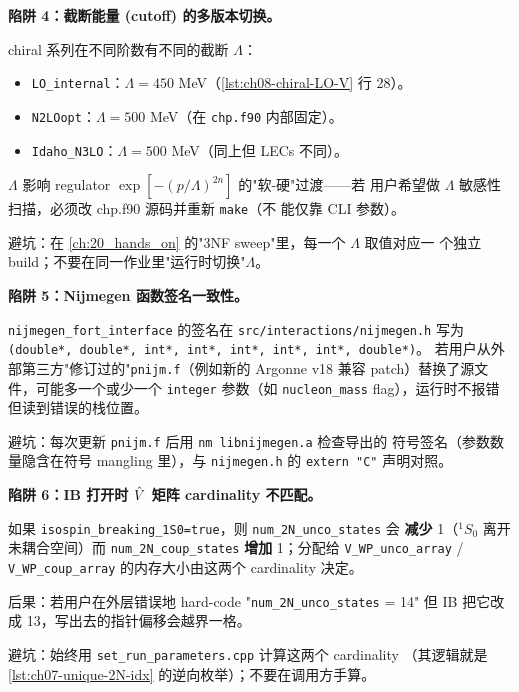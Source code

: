 \begin{pitfallbox}
\textbf{陷阱 4：截断能量 (cutoff) 的多版本切换。}

chiral 系列在不同阶数有不同的截断 \(\Lambda\)：
\begin{itemize}
  \item \texttt{LO\_internal}：\(\Lambda = 450\) MeV（\cref{lst:ch08-chiral-LO-V} 行 28）。
  \item \texttt{N2LOopt}：\(\Lambda = 500\) MeV（在 \texttt{chp.f90} 内部固定）。
  \item \texttt{Idaho\_N3LO}：\(\Lambda = 500\) MeV（同上但 LECs 不同）。
\end{itemize}

\(\Lambda\) 影响 regulator \(\exp[-(p/\Lambda)^{2n}]\) 的"软-硬"过渡——若
用户希望做 \(\Lambda\) 敏感性扫描，必须改 chp.f90 源码并重新 \texttt{make}（不
能仅靠 CLI 参数）。

避坑：在 \cref{ch:20_hands_on} 的"3NF sweep"里，每一个 \(\Lambda\) 取值对应一
个独立 build；不要在同一作业里"运行时切换"\(\Lambda\)。
\end{pitfallbox}

\begin{pitfallbox}
\textbf{陷阱 5：Nijmegen 函数签名一致性。}

\texttt{nijmegen\_fort\_interface} 的签名在
\texttt{src/interactions/nijmegen.h} 写为
\texttt{(double*, double*, int*, int*, int*, int*, int*, double*)}。
若用户从外部第三方"修订过的"\texttt{pnijm.f}（例如新的 Argonne v18 兼容
patch）替换了源文件，可能多一个或少一个 \texttt{integer} 参数（如
\texttt{nucleon\_mass} flag），运行时不报错但读到错误的栈位置。

避坑：每次更新 \texttt{pnijm.f} 后用 \texttt{nm libnijmegen.a} 检查导出的
符号签名（参数数量隐含在符号 mangling 里），与
\texttt{nijmegen.h} 的 \texttt{extern "C"} 声明对照。
\end{pitfallbox}

\begin{pitfallbox}
\textbf{陷阱 6：IB 打开时 \(\hat{V}\) 矩阵 cardinality 不匹配。}

如果 \texttt{isospin\_breaking\_1S0=true}，则 \texttt{num\_2N\_unco\_states} 会
\textbf{减少} 1（\({}^1S_0\) 离开未耦合空间）而 \texttt{num\_2N\_coup\_states}
\textbf{增加} 1；分配给 \texttt{V\_WP\_unco\_array} / \texttt{V\_WP\_coup\_array}
的内存大小由这两个 cardinality 决定。

后果：若用户在外层错误地 hard-code "\texttt{num\_2N\_unco\_states} = 14"
但 IB 把它改成 13，写出去的指针偏移会越界一格。

避坑：始终用 \texttt{set\_run\_parameters.cpp} 计算这两个 cardinality
（其逻辑就是 \cref{lst:ch07-unique-2N-idx} 的逆向枚举）；不要在调用方手算。
\end{pitfallbox}

